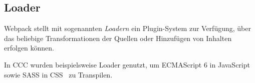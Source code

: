 \subsection{Loader}
\label{sec:gw_loader}

Webpack stellt mit sogenannten \emph{Loadern} ein
Plugin-System zur Verfügung, über das beliebige Transformationen der Quellen
oder Hinzufügen von Inhalten erfolgen können.

In CCC wurden beispielsweise Loader genutzt, um ECMAScript 6 in
JavaScript~\cite{babelLoader} sowie SASS in CSS~\cite{sassLoader} zu Transpilen.
